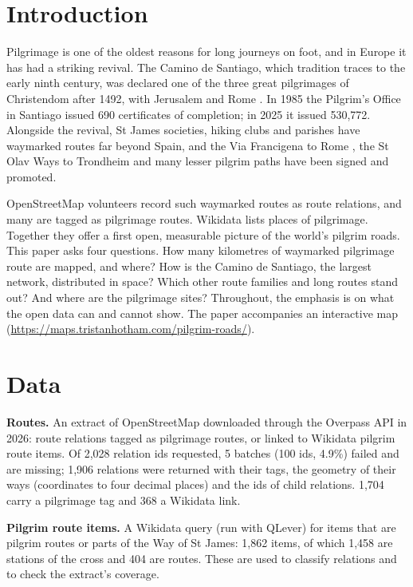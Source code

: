 \documentclass[11pt,a4paper]{article}
\begin{document}
\section{Introduction}
Pilgrimage is one of the oldest reasons for long journeys on foot, and in Europe it has had a striking revival. The Camino de Santiago, which tradition traces to the early ninth century, was declared one of the three great pilgrimages of Christendom after 1492, with Jerusalem and Rome \citep{wikicamino}. In 1985 the Pilgrim's Office in Santiago issued 690 certificates of completion; in 2025 it issued 530,772. Alongside the revival, St James societies, hiking clubs and parishes have waymarked routes far beyond Spain, and the Via Francigena to Rome \citep{wikivf}, the St Olav Ways to Trondheim \citep{wikiolav} and many lesser pilgrim paths have been signed and promoted.

OpenStreetMap volunteers record such waymarked routes as route relations, and many are tagged as pilgrimage routes. Wikidata lists places of pilgrimage. Together they offer a first open, measurable picture of the world's pilgrim roads. This paper asks four questions. How many kilometres of waymarked pilgrimage route are mapped, and where? How is the Camino de Santiago, the largest network, distributed in space? Which other route families and long routes stand out? And where are the pilgrimage sites? Throughout, the emphasis is on what the open data can and cannot show. The paper accompanies an interactive map (\url{https://maps.tristanhotham.com/pilgrim-roads/}).

\section{Data}
\textbf{Routes.} An extract of OpenStreetMap \citep{osm} downloaded through the Overpass API in 2026: route relations tagged as pilgrimage routes, or linked to Wikidata pilgrim route items. Of 2,028 relation ids requested, 5 batches (100 ids, 4.9\%) failed and are missing; 1,906 relations were returned with their tags, the geometry of their ways (coordinates to four decimal places) and the ids of child relations. 1,704 carry a pilgrimage tag and 368 a Wikidata link.

\textbf{Pilgrim route items.} A Wikidata \citep{wikidata} query (run with QLever) for items that are pilgrim routes or parts of the Way of St James: 1,862 items, of which 1,458 are stations of the cross and 404 are routes. These are used to classify relations and to check the extract's coverage.
\end{document}

